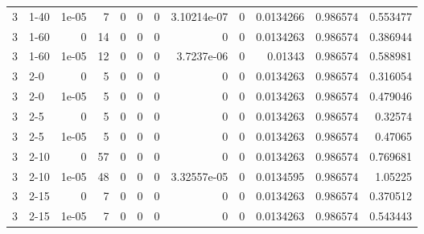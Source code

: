 \begin{tabular}{rlrrrrrrrrrr}
     3 & 1-40   &      1e-05 &           7 &                 0 &                 0 &     0           &     3.10214e-07 &      0           &        0.0134266 &               0.986574 &           0.553477 \\
     3 & 1-60   &      0     &          14 &                 0 &                 0 &     0           &     0           &      0           &        0.0134263 &               0.986574 &           0.386944 \\
     3 & 1-60   &      1e-05 &          12 &                 0 &                 0 &     0           &     3.7237e-06  &      0           &        0.01343   &               0.986574 &           0.588981 \\
     3 & 2-0    &      0     &           5 &                 0 &                 0 &     0           &     0           &      0           &        0.0134263 &               0.986574 &           0.316054 \\
     3 & 2-0    &      1e-05 &           5 &                 0 &                 0 &     0           &     0           &      0           &        0.0134263 &               0.986574 &           0.479046 \\
     3 & 2-5    &      0     &           5 &                 0 &                 0 &     0           &     0           &      0           &        0.0134263 &               0.986574 &           0.32574  \\
     3 & 2-5    &      1e-05 &           5 &                 0 &                 0 &     0           &     0           &      0           &        0.0134263 &               0.986574 &           0.47065  \\
     3 & 2-10   &      0     &          57 &                 0 &                 0 &     0           &     0           &      0           &        0.0134263 &               0.986574 &           0.769681 \\
     3 & 2-10   &      1e-05 &          48 &                 0 &                 0 &     0           &     3.32557e-05 &      0           &        0.0134595 &               0.986574 &           1.05225  \\
     3 & 2-15   &      0     &           7 &                 0 &                 0 &     0           &     0           &      0           &        0.0134263 &               0.986574 &           0.370512 \\
     3 & 2-15   &      1e-05 &           7 &                 0 &                 0 &     0           &     0           &      0           &        0.0134263 &               0.986574 &           0.543443 \\

\end{tabular}
